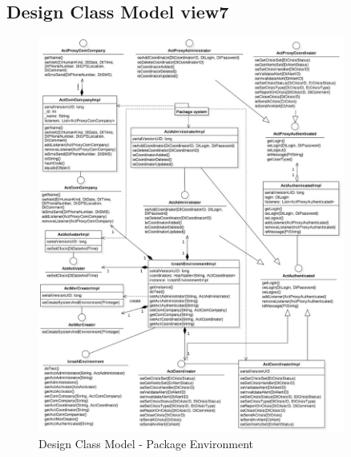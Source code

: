 \subsection{Design Class Model view7}
\begin{figure}[h!]
	\centering
	\includegraphics[width=0.9\textwidth]{./images/dcm_environment.eps}
	\caption{Design Class Model - Package Environment}
\end{figure}